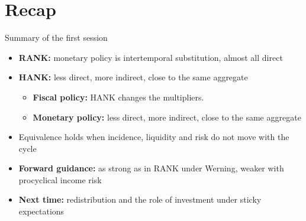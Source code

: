 \documentclass[10pt,english]{beamer}
\begin{document}
\section{Recap}

%
\begin{frame}{Summary of the first session}
\begin{itemize}
\item <+->\textbf{RANK:} monetary policy is intertemporal substitution, almost all direct
\item <+->\textbf{HANK:} less direct, more indirect, close to the same aggregate
\begin{itemize}
    \item <+->\textbf{Fiscal policy:} HANK changes the multipliers. 
    \item <+->\textbf{Monetary policy:} less direct, more indirect, close to the same aggregate
\end{itemize}
\item <+->Equivalence holds when incidence, liquidity and risk do not move with the cycle
\item <+->\textbf{Forward guidance:} as strong as in RANK under Werning, weaker with procyclical income risk
\item <+->\textbf{Next time:} redistribution and the role of investment under sticky expectations
\end{itemize}
\end{frame}
%
\end{document}

